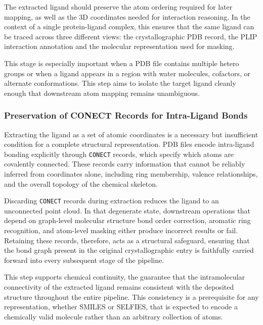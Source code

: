 \documentclass[a4paper,12pt]{article}
\begin{document}
The extracted ligand should preserve the atom ordering required for later
mapping, as well as the 3D coordinates needed for interaction reasoning. In the
context of a single protein-ligand complex, this ensures that the same ligand
can be traced across three different views: the crystallographic PDB record, the
PLIP interaction annotation and the molecular representation used for masking.

This stage is especially important when a PDB file contains multiple hetero
groups or when a ligand appears in a region with water molecules, cofactors, or
alternate conformations. This step aims to isolate the target ligand
cleanly enough that downstream atom mapping remains unambiguous.

\subsubsection{Preservation of CONECT Records for Intra-Ligand Bonds}

Extracting the ligand as a set of atomic coordinates is a necessary but
insufficient condition for a complete structural representation. PDB files
encode intra-ligand bonding explicitly through \texttt{CONECT} records, which
specify which atoms are covalently connected. These records carry
information that cannot be reliably inferred from coordinates alone, including
ring membership, valence relationships, and the overall topology of the chemical
skeleton.

Discarding \texttt{CONECT} records during extraction reduces the ligand to an
unconnected point cloud. In that degenerate state, downstream operations that
depend on graph-level molecular structure bond order correction, aromatic ring
recognition, and atom-level masking either produce incorrect results or fail. Retaining these records, therefore, acts as a structural safeguard,
ensuring that the bond graph present in the original crystallographic entry is
faithfully carried forward into every subsequent stage of the pipeline.

This step supports chemical continuity, the
guarantee that the intramolecular connectivity of the extracted ligand remains
consistent with the deposited structure throughout the entire pipeline. This
consistency is a prerequisite for any representation, whether SMILES or SELFIES,
that is expected to encode a chemically valid molecule rather than an arbitrary
collection of atoms.


\end{document}
